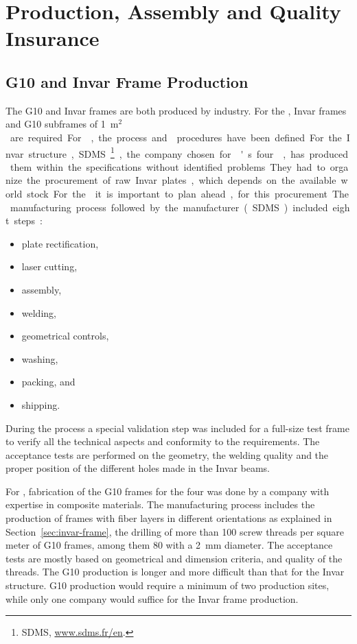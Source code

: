 \section{Production, Assembly and Quality Insurance}
\label{sec:dp-crp-prod-assy}

\subsection{G10 and Invar Frame Production}
\label{sec:dp-crp-frame}

The G10 and Invar frames are both produced by industry. For the , %
\dptotcrp Invar frames and \dpnumpmtch %
G10 subframes of \SI{1}{m$^2$} are required. %
For , the process and  procedures have been defined.
For the Invar structure, SDMS\footnote{SDMS\texttrademark{}, \url{www.sdms.fr/en}.}, the company chosen for 's four ,  %
has produced them within the specifications without identified problems.
They had to organize the procurement of raw Invar plates, which depends on the available world stock. For the  it is important to plan ahead,  for this procurement. 
The manufacturing process followed by the manufacturer (SDMS) included eight steps:\\
\begin{itemize}
\item plate rectification,
\item  laser cutting,
\item  assembly,
\item  welding,
\item  geometrical controls,
\item  washing,
\item  packing, and
\item  shipping.
\end{itemize}

During the process a special validation step was included  for a full-size test frame to verify all the technical aspects and conformity to the requirements. 
The acceptance tests are performed on the geometry, the welding quality and the proper position of the different holes made in the Invar beams.

For , fabrication of the G10 frames for the four  was done by a company with expertise in composite materials. The manufacturing process includes the %
production of frames with fiber layers in different orientations as explained in Section~\ref{sec:invar-frame}, the drilling of more than \num{100} screw threads per square meter of G10 frames, among them \num{80} with a \SI{2}{mm} diameter.
The acceptance tests are mostly based on geometrical and dimension criteria, and quality of the threads.  
The G10 production is longer and more difficult than that for the Invar structure. G10 production would require a minimum of two production sites, while only one company would suffice for the Invar frame production.


